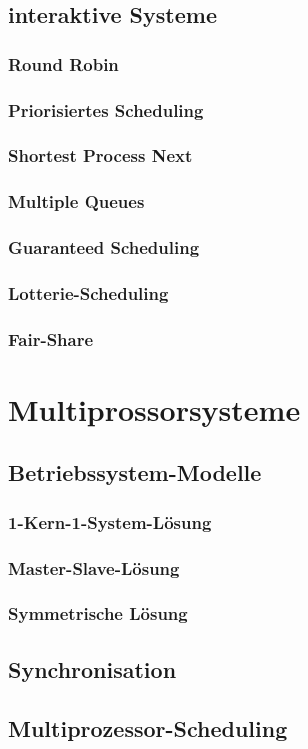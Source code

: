 \subsection{interaktive Systeme}
\begin{frame}
	\frametitle{Round Robin}
\end{frame}
\begin{frame}
	\frametitle{Priorisiertes Scheduling}
\end{frame}
\begin{frame}
	\frametitle{Shortest Process Next}
\end{frame}
\begin{frame}
	\frametitle{Multiple Queues}
\end{frame}
\begin{frame}
	\frametitle{Guaranteed Scheduling}
\end{frame}
\begin{frame}
	\frametitle{Lotterie-Scheduling}
\end{frame}
\begin{frame}
	\frametitle{Fair-Share}
\end{frame}


\section{Multiprossorsysteme}
\subsection{Betriebssystem-Modelle}
\begin{frame}
	\frametitle{1-Kern-1-System-Lösung}
\end{frame}
\begin{frame}
	\frametitle{Master-Slave-Lösung}
\end{frame}
\begin{frame}
	\frametitle{Symmetrische Lösung}
\end{frame}
\subsection{Synchronisation}
\subsection{Multiprozessor-Scheduling}

%